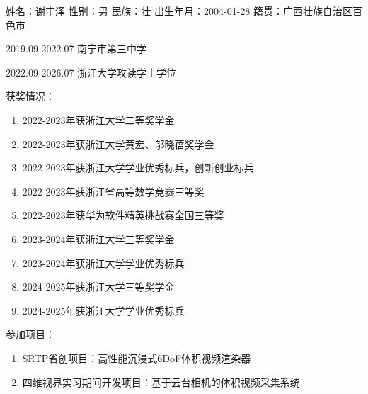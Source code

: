 \clearpage
{}

姓名：谢丰泽 性别：男 民族：壮 出生年月：2004-01-28 籍贯：广西壮族自治区百色市

2019.09-2022.07 南宁市第三中学

2022.09-2026.07 浙江大学攻读学士学位

获奖情况：
\begin{enumerate}
    \item 2022-2023年获浙江大学二等奖学金
    \item 2022-2023年获浙江大学黄宏、邬晓蓓奖学金
    \item 2022-2023年获浙江大学学业优秀标兵，创新创业标兵
    \item 2022-2023年获浙江省高等数学竞赛三等奖
    \item 2022-2023年获华为软件精英挑战赛全国三等奖
    \item 2023-2024年获浙江大学三等奖学金
    \item 2023-2024年获浙江大学学业优秀标兵
    \item 2024-2025年获浙江大学三等奖学金
    \item 2024-2025年获浙江大学学业优秀标兵
\end{enumerate}

参加项目：
\begin{enumerate}
    \item SRTP省创项目：高性能沉浸式6DoF体积视频渲染器
    \item 四维视界实习期间开发项目：基于云台相机的体积视频采集系统
\end{enumerate}